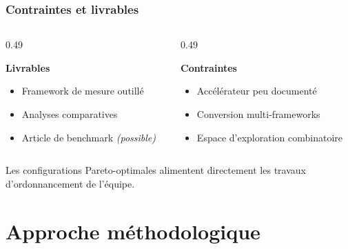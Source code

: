 \documentclass[
	11pt,
]{beamer}
\begin{document}
\begin{frame}
	\frametitle{Contraintes et livrables}

	\footnotesize
	\vspace{0.4em}
	\begin{columns}[T]
	\begin{column}{0.49\textwidth}
		\colorbox{tpugreenbg}{\parbox{\dimexpr\linewidth-12pt\relax}{
			\vspace{0.2em}
			\textcolor{tpugreen}{\textbf{Livrables}}
			\begin{itemize}
				\item Framework de mesure outillé
				\item Analyses comparatives
				\item Article de benchmark \textit{(possible)}
			\end{itemize}
			\vspace{0.2em}
		}}
	\end{column}

	\begin{column}{0.49\textwidth}
		\colorbox{tpuredbg}{\parbox{\dimexpr\linewidth-12pt\relax}{
			\vspace{0.2em}
			\textcolor{tpured}{\textbf{Contraintes}}
			\begin{itemize}
				\item Accélérateur peu documenté
				\item Conversion multi-frameworks
				\item Espace d'exploration combinatoire
			\end{itemize}
			\vspace{0.2em}
		}}
	\end{column}
	\end{columns}

	\vspace{1.0em}
	\begin{center}
	\colorbox{tpulight}{\parbox{0.9\linewidth}{\centering
	\footnotesize Les configurations Pareto-optimales alimentent directement
	les travaux d'ordonnancement de l'équipe.}}
	\end{center}
\end{frame}

\section{Approche méthodologique}
\end{document}
